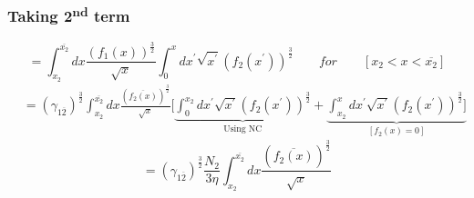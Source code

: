 \documentclass[fleqn, 10pt]{article}
\begin{document}
\subsubsection*{Taking 2\textsuperscript{nd} term}
\begin{equation}
   = \int^{\overline{x_{2}}}_{x_{2}} dx \frac{(f_{1}(x))^\frac{3}{2}}{\sqrt{x}} \int^{x}_{0} dx^\prime \sqrt{x^\prime} (f_{2}(x^\prime))^\frac{3}{2} \qquad for \qquad [x_{2}<x<\overline{x_{2}}]
\end{equation}
\begin{equation*}
\begin{split}
   & = (\gamma_{1\overline{2}})^\frac{3}{2} \int^{\overline{x_{2}}}_{x_{2}}dx \frac{(\overline{f_{2}(x)})^\frac{3}{2}}{\sqrt{x}} \biggl[ \underbrace{\int^{x_{2}}_{0} dx^\prime \sqrt{x^\prime} (f_{2}(x^\prime))^\frac{3}{2}}_{\text{Using NC}}+ \underbrace{\int^{x}_{x_{2}} dx^\prime \sqrt{x^\prime} (f_{2}(x^\prime))^\frac{3}{2}\biggr]}_{[f_{2}(x) = 0 ]}  
    \end{split}
\end{equation*}
\begin{equation*}
    = (\gamma_{1\overline{2}})^\frac{3}{2} \frac{N_{2}}{3 \eta} \int^{\overline{x_{2}}}_{x_{2}}dx \frac{(\overline{f_{2}(x)})^\frac{3}{2}}{\sqrt{x}}
\end{equation*}
\end{document}
